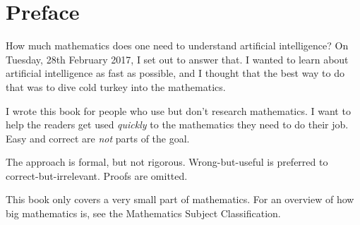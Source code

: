 \chapter*{Preface}

How much mathematics does one need to understand artificial intelligence?
On Tuesday, 28th February 2017, I set out to answer that.
I wanted to learn about artificial intelligence as fast as possible,
and I thought that the best way to do that was to dive cold turkey into the mathematics.

I wrote this book for people who use but don't research mathematics.
I want to help the readers get used \emph{quickly} to the mathematics they need to do their job.
Easy and correct are \emph{not} parts of the goal.

The approach is formal, but not rigorous.
Wrong-but-useful is preferred to correct-but-irrelevant.
Proofs are omitted.

This book only covers a very small part of mathematics.
For an overview of how big mathematics is,
see the Mathematics Subject Classification.

